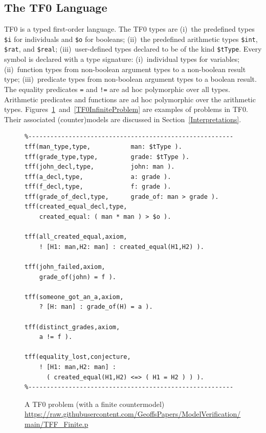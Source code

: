 \documentclass[letterpaper]{article}
\newcommand{\smalltt}[1]{\small \texttt{#1}}
\begin{document}
\subsection{The TF0 Language}
\label{TF0}

TF0 is a typed first-order language.
The TF0 types are
(i)~the predefined types {\smalltt{\$i}} for individuals and {\smalltt{\$o}} for booleans; 
(ii)~the predefined arithmetic types {\smalltt{\$int}}, {\smalltt{\$rat}}, and {\smalltt{\$real}}; 
(iii)~user-defined types declared to be of the kind {\smalltt{\$tType}}.
Every symbol is declared with a type signature:
(i)~individual types for variables;
(ii)~function types from non-boolean argument types to a non-boolean result type;
(iii)~predicate types from non-boolean argument types to a boolean result.
The equality predicates {\tt =} and {\tt !=} are ad hoc polymorphic over all types. 
Arithmetic predicates and functions are ad hoc polymorphic over the arithmetic types.
Figures~\ref{TF0FiniteProblem}~and~\ref{TF0InfiniteProblem} are examples of problems in TF0.  Their associated (counter)models are discussed in Section~\ref{Interpretations}.

\begin{figure}[htbp]
\scriptsize
{}
\begin{verbatim}
%--------------------------------------------------------
tff(man_type,type,           man: $tType ).
tff(grade_type,type,         grade: $tType ).
tff(john_decl,type,          john: man ).
tff(a_decl,type,             a: grade ).
tff(f_decl,type,             f: grade ).
tff(grade_of_decl,type,      grade_of: man > grade ).
tff(created_equal_decl,type, 
    created_equal: ( man * man ) > $o ).

tff(all_created_equal,axiom,
    ! [H1: man,H2: man] : created_equal(H1,H2) ).

tff(john_failed,axiom,
    grade_of(john) = f ).

tff(someone_got_an_a,axiom,
    ? [H: man] : grade_of(H) = a ).

tff(distinct_grades,axiom,
    a != f ).

tff(equality_lost,conjecture,
    ! [H1: man,H2: man] :
      ( created_equal(H1,H2) <=> ( H1 = H2 ) ) ).
%--------------------------------------------------------
\end{verbatim}
\caption{A TF0 problem (with a finite countermodel)\\
{\scriptsize \url{https://raw.githubusercontent.com/GeoffsPapers/ModelVerification/main/TFF_Finite.p}}}
\label{TF0FiniteProblem}
\end{figure}
\end{document}
